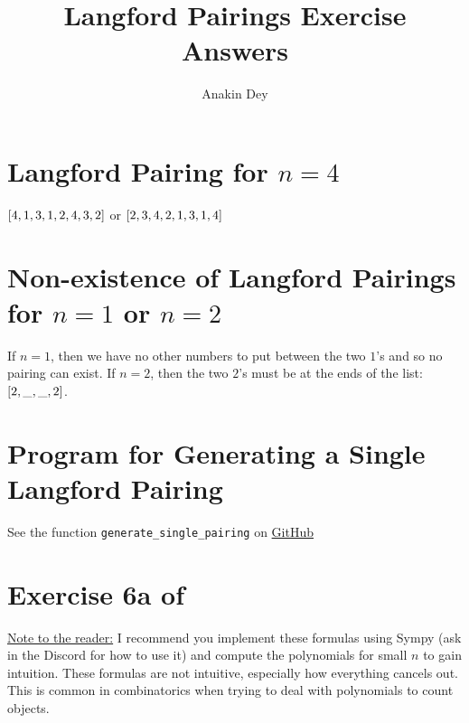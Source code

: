 \documentclass[letterpaper]{article}
\title{Langford Pairings Exercise Answers}
\author{Anakin Dey}
\begin{document}
\maketitle

\section*{Langford Pairing for $n = 4$}

$\bqty{4, 1, 3, 1, 2, 4, 3, 2}$ or $\bqty{2, 3, 4, 2, 1, 3, 1, 4}$

\section*{Non-existence of Langford Pairings for $n = 1$ or $n = 2$}

If $n = 1$, then we have no other numbers to put between the two $1$'s and so no pairing can exist.
If $n = 2$, then the two $2$'s must be at the ends of the list: $\bqty{2, \_, \_, 2}$.

\section*{Program for Generating a Single Langford Pairing}

See the function \texttt{generate\_single\_pairing} on \href{https://github.com/SIGma-UIUC/meetings/blob/main/SP23/3-langford/langford_pairing.py}{GitHub}

\section*{Exercise 6a of \cite[Chapter~7]{TAOCP4A}}

\underline{Note to the reader:} I recommend you implement these formulas using Sympy (ask in the Discord for how to use it) and compute the polynomials for small $n$ to gain intuition.
These formulas are not intuitive, especially how everything cancels out.
This is common in combinatorics when trying to deal with polynomials to count objects.
\end{document}
